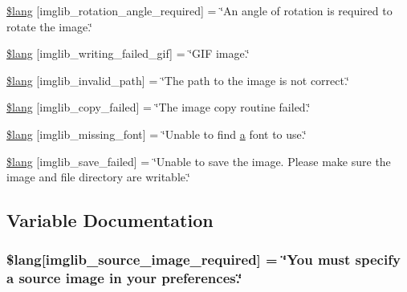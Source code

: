 \begin{DoxyCompactItemize}
\item 
\hyperlink{system_2language_2english_2imglib__lang_8php_a1110d59ea8fd0564e78068dbda3438fb}{\$lang} \mbox{[}\textquotesingle{}imglib\+\_\+rotation\+\_\+angle\+\_\+required\textquotesingle{}\mbox{]} = \char`\"{}An angle of rotation is required to rotate the image.\char`\"{}
\item 
\hyperlink{system_2language_2english_2imglib__lang_8php_a6169e9ed18d970dcc8965c4f195ae3e7}{\$lang} \mbox{[}\textquotesingle{}imglib\+\_\+writing\+\_\+failed\+\_\+gif\textquotesingle{}\mbox{]} = \char`\"{}G\+IF image.\char`\"{}
\item 
\hyperlink{system_2language_2english_2imglib__lang_8php_a8ff486c25806a4731d1ffe20431df825}{\$lang} \mbox{[}\textquotesingle{}imglib\+\_\+invalid\+\_\+path\textquotesingle{}\mbox{]} = \char`\"{}The path to the image is not correct.\char`\"{}
\item 
\hyperlink{system_2language_2english_2imglib__lang_8php_a9363000d2005b8276b39d581a11b562d}{\$lang} \mbox{[}\textquotesingle{}imglib\+\_\+copy\+\_\+failed\textquotesingle{}\mbox{]} = \char`\"{}The image copy routine failed.\char`\"{}
\item 
\hyperlink{system_2language_2english_2imglib__lang_8php_a935800aad2be18ca4fe99bb074674848}{\$lang} \mbox{[}\textquotesingle{}imglib\+\_\+missing\+\_\+font\textquotesingle{}\mbox{]} = \char`\"{}Unable to find \hyperlink{_chart_8min_8js_aef3b685c08bc6c76c8e729bd0e93901d}{a} font to use.\char`\"{}
\item 
\hyperlink{system_2language_2english_2imglib__lang_8php_a4d7a99fddc60c97a7327fa0125dea264}{\$lang} \mbox{[}\textquotesingle{}imglib\+\_\+save\+\_\+failed\textquotesingle{}\mbox{]} = \char`\"{}Unable to save the image. Please make sure the image and file directory are writable.\char`\"{}
\end{DoxyCompactItemize}


\subsection{Variable Documentation}
\subsubsection[{\texorpdfstring{\$lang}{$lang}}]{\setlength{\rightskip}{0pt plus 5cm}\$lang\mbox{[}\textquotesingle{}imglib\+\_\+source\+\_\+image\+\_\+required\textquotesingle{}\mbox{]} = \char`\"{}You must specify {\bf a} source image in your preferences.\char`\"{}}\hypertarget{system_2language_2english_2imglib__lang_8php_af48787ab142f633036ebdf1cc5da7409}{}\label{system_2language_2english_2imglib__lang_8php_af48787ab142f633036ebdf1cc5da7409}


